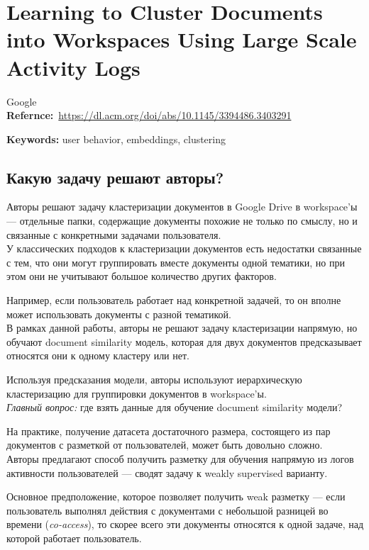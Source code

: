\chapter{Learning to Cluster Documents into Workspaces Using Large Scale Activity Logs}

Google \\

\textbf{Refernce:}~\url{https://dl.acm.org/doi/abs/10.1145/3394486.3403291}~\cite{kong2020learning}

\textbf{Keywords:} user behavior, embeddings, clustering

\section*{Какую задачу решают авторы?}

Авторы решают задачу кластеризации документов в Google Drive в workspace'ы --- отдельные папки, содержащие документы похожие не только по смыслу, но и связанные с конкретными задачами пользователя. \\

У классических подходов к кластеризации документов есть недостатки связанные с тем, что они могут группировать вместе документы одной тематики, но при этом они не учитывают большое количество других факторов.

Например, если пользователь работает над конкретной задачей, то он вполне может использовать документы с разной тематикой. \\

В рамках данной работы, авторы не решают задачу кластеризации напрямую, но обучают document similarity модель, которая для двух документов предсказывает относятся они к одному кластеру или нет.

Используя предсказания модели, авторы используют иерархическую кластеризацию для группировки документов в workspace'ы. \\

\textit{Главный вопрос:} где взять данные для обучение document similarity модели?

На практике, получение датасета достаточного размера, состоящего из пар документов с разметкой от пользователей, может быть довольно сложно. \\

Авторы предлагают способ получить разметку для обучения напрямую из логов активности пользователей --- сводят задачу к weakly supervised варианту.

Основное предположение, которое позволяет получить weak разметку --- если пользователь выполнял действия с документами с небольшой разницей во времени (\textit{co-access}), то скорее всего эти документы относятся к одной задаче, над которой работает пользователь. \\

